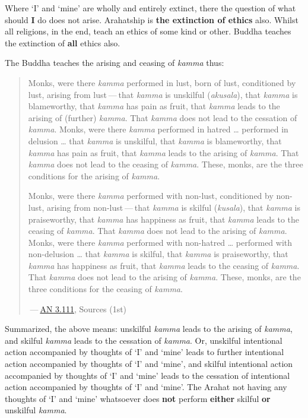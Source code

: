 Where `I' and `mine' are wholly and entirely extinct, there the question of what should \textbf{I} do does not arise. Arahatship is \textbf{the extinction of ethics} also. Whilst all religions, in the end, teach an ethics of some kind or other. Buddha teaches the extinction of \textbf{all} ethics also.

The Buddha teaches the arising and ceasing of \emph{kamma} thus:

\begin{quote}
Monks, were there \emph{kamma} performed in lust, born of lust, conditioned by lust, arising from lust --- that \emph{kamma} is unskilful (\emph{akusala}), that \emph{kamma} is blameworthy, that \emph{kamma} has pain as fruit, that \emph{kamma} leads to the arising of (further) \emph{kamma}. That \emph{kamma} does not lead to the cessation of \emph{kamma}. Monks, were there \emph{kamma} performed in hatred \ldots{} performed in delusion \ldots{} that \emph{kamma} is unskilful, that \emph{kamma} is blameworthy, that \emph{kamma} has pain as fruit, that \emph{kamma} leads to the arising of \emph{kamma}. That \emph{kamma} does not lead to the ceasing of \emph{kamma}. These, monks, are the three conditions for the arising of \emph{kamma}.

Monks, were there \emph{kamma} performed with non-lust, conditioned by non-lust, arising from non-lust --- that \emph{kamma} is skilful (\emph{kusala}), that \emph{kamma} is praiseworthy, that \emph{kamma} has happiness as fruit, that \emph{kamma} leads to the ceasing of \emph{kamma}. That \emph{kamma} does not lead to the arising of \emph{kamma}. Monks, were there \emph{kamma} performed with non-hatred \ldots{} performed with non-delusion \ldots{} that \emph{kamma} is skilful, that \emph{kamma} is praiseworthy, that \emph{kamma} has happiness as fruit, that \emph{kamma} leads to the ceasing of \emph{kamma}. That \emph{kamma} does not lead to the arising of \emph{kamma}. These, monks, are the three conditions for the ceasing of \emph{kamma}.

 --- \href{https://suttacentral.net/an3.111/en/sujato}{AN 3.111}, Sources (1st)
\end{quote}

Summarized, the above means: unskilful \emph{kamma} leads to the arising of \emph{kamma}, and skilful \emph{kamma} leads to the cessation of \emph{kamma}. Or, unskilful intentional action accompanied by thoughts of `I' and `mine' leads to further intentional action accompanied by thoughts of `I' and `mine', and skilful intentional action accompanied by thoughts of `I' and `mine' leads to the cessation of intentional action accompanied by thoughts of `I' and `mine'. The Arahat not having any thoughts of `I' and `mine' whatsoever does \textbf{not} perform \textbf{either} skilful \textbf{or} unskilful \emph{kamma}.

